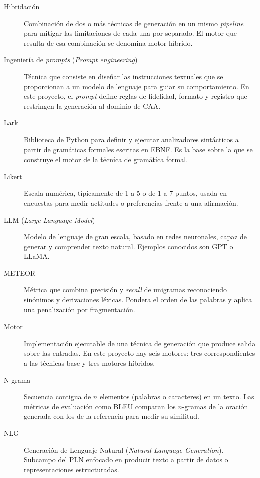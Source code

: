 \begin{description}
    \item[Hibridación] Combinación de dos o más técnicas de generación en un mismo \textit{pipeline} para mitigar las limitaciones de cada una por separado. El motor que resulta de esa combinación se denomina motor híbrido.

    \item[Ingeniería de \textit{prompts} (\textit{Prompt engineering})] Técnica que consiste en diseñar las instrucciones textuales que se proporcionan a un modelo de lenguaje para guiar su comportamiento. En este proyecto, el \textit{prompt} define reglas de fidelidad, formato y registro que restringen la generación al dominio de CAA.

    \item[Lark] Biblioteca de Python para definir y ejecutar analizadores sintácticos a partir de gramáticas formales escritas en EBNF. Es la base sobre la que se construye el motor de la técnica de gramática formal.

    \item[Likert] Escala numérica, típicamente de 1 a 5 o de 1 a 7 puntos, usada en encuestas para medir actitudes o preferencias frente a una afirmación.

    \item[LLM (\textit{Large Language Model})] Modelo de lenguaje de gran escala, basado en redes neuronales, capaz de generar y comprender texto natural. Ejemplos conocidos son GPT o LLaMA.

    \item[METEOR] Métrica que combina precisión y \textit{recall} de unigramas reconociendo sinónimos y derivaciones léxicas. Pondera el orden de las palabras y aplica una penalización por fragmentación.

    \item[Motor] Implementación ejecutable de una técnica de generación que produce salida sobre las entradas. En este proyecto hay seis motores: tres correspondientes a las técnicas base y tres motores híbridos.

    \item[N-grama] Secuencia contigua de $n$ elementos (palabras o caracteres) en un texto. Las métricas de evaluación como BLEU comparan los $n$-gramas de la oración generada con los de la referencia para medir su similitud.

    \item[NLG] Generación de Lenguaje Natural (\textit{Natural Language Generation}). Subcampo del PLN enfocado en producir texto a partir de datos o representaciones estructuradas.


\end{description}
